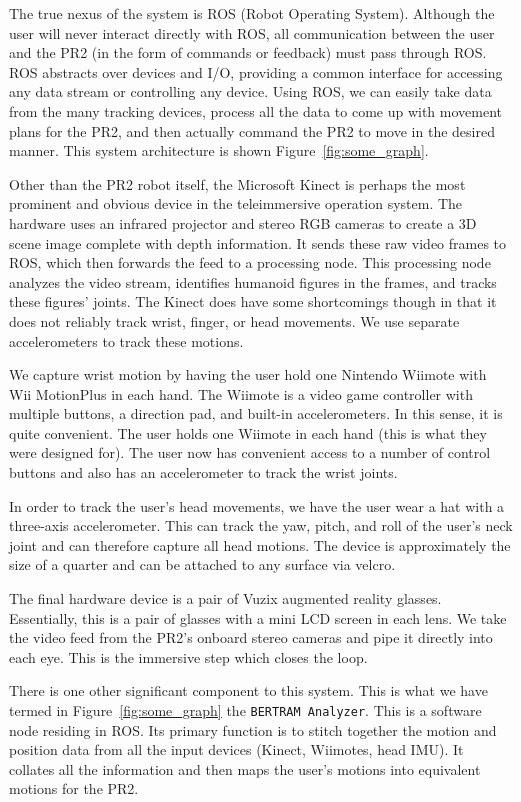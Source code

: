 \documentclass{sig-alternate}
\begin{document}
The true nexus of the system is ROS (Robot Operating System). Although the
user will never interact directly with ROS, all communication between the
user and the PR2 (in the form of commands or feedback) must pass through ROS.
ROS abstracts over devices and I/O, providing a common interface for accessing
any data stream or controlling any device. Using ROS, we can easily take
data from the many tracking devices, process all the data to come up with
movement plans for the PR2, and then actually command the PR2 to move in the
desired manner. This system architecture is shown Figure~\ref{fig:some_graph}.

Other than the PR2 robot itself, the Microsoft Kinect is perhaps the most 
prominent and obvious device in the teleimmersive operation system. The
hardware uses an 
infrared projector and stereo RGB cameras to create a 3D scene image complete
with depth information. It sends these raw video frames to ROS, which then
forwards the feed to a processing node. This processing node analyzes the 
video stream, identifies humanoid figures in the frames, and tracks these 
figures' joints. The Kinect does have some shortcomings though in that it does 
not reliably track wrist, finger, or head movements. We use separate 
accelerometers to track these motions.

We capture wrist motion by having the user hold one Nintendo Wiimote with 
Wii MotionPlus in each hand. The Wiimote is a video game controller with 
multiple buttons, a direction pad, and built-in accelerometers. In this sense,
it is quite convenient. The user holds one Wiimote in each hand (this is 
what they were designed for). The user now has convenient access to a number of
control buttons and also has an accelerometer to track the wrist joints.

In order to track the user's head movements, we have the user wear a hat
with a three-axis accelerometer. This can track the yaw, pitch, and roll of the
user's neck joint and can therefore capture all head motions. The device is
approximately the size of a quarter and can be attached to any surface via
velcro.

The final hardware device is a pair of Vuzix augmented reality glasses.
Essentially, this is a pair of glasses with a mini LCD screen in each lens.
We take the video feed from the PR2's onboard stereo cameras and pipe it
directly into each eye. This is the immersive step which closes the loop.

There is one other significant component to this system. This is what we have
termed in Figure~\ref{fig:some_graph} the {\tt BERTRAM Analyzer}. This is a 
software node residing in ROS. Its primary function is to stitch together the
motion and position data from all the input devices (Kinect, Wiimotes, head 
IMU). It collates all the information and then maps the user's motions
into equivalent motions for the PR2.
\end{document}
